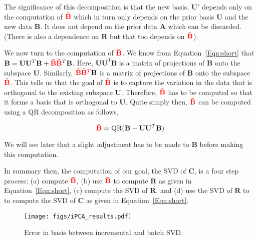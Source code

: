 The significance of this decomposition is that the new basis, $\mathbf{U'}$ depends only on the computation of ${\color{red}\mathbf{\tilde{B}}}$ which in turn only depends on the prior basis $\mathbf{U}$ and the new data  $\mathbf{B}$.  It does not depend on the prior data $\mathbf{A}$ which can be discarded.  (There is also a dependence on $\mathbf{R}$ but that too depends on ${\color{red}\mathbf{\tilde{B}}}$).

We now turn to the computation of $ {\color{red}\mathbf{\tilde{B}}}$.  We know from Equation~\ref{Eqn:short} that $\mathbf{B}=\mathbf{U}\mathbf{U}^T\mathbf{B} + {\color{red}\mathbf{\tilde{B}}} {{\color{red}\mathbf{\tilde{B}}}^T}\mathbf{B}$.  Here, $\mathbf{U}\mathbf{U}^T\mathbf{B}$ is a matrix of projections of $\mathbf{B}$ onto the subspace $\mathbf{U}$.  Similarly, ${\color{red}\mathbf{\tilde{B}}} {\color{red}\mathbf{\tilde{B}}^T}\mathbf{B}$ is a matrix of projections of $\mathbf{B}$ onto the subspace ${\color{red}\mathbf{\tilde{B}}}$.  This tells us that the goal of ${\color{red}\mathbf{\tilde{B}}}$ is to capture the variation in the data that is orthogonal to the existing subspace $\mathbf{U}$.  Therefore, ${\color{red}\mathbf{\tilde{B}}}$ has to be computed so that it forms a basis that is orthogonal to $\mathbf{U}$.  Quite simply then, ${\color{red}\mathbf{\tilde{B}}}$ can be computed using a QR decomposition as follows,


\begin{equation}
{\color{red}\mathbf{\tilde{B}}}=\textrm{QR}(\mathbf{B} - \mathbf{U}\mathbf{U}^T\mathbf{B})
\end{equation}

We will see later that a slight adjustment has to be made to $\mathbf{B}$ before making this computation.

In summary then, the computation of our goal, the SVD of $\mathbf{C}$, is a four step process: (a) compute ${\color{red}\mathbf{\tilde{B}}}$, (b) use ${\color{red}\mathbf{\tilde{B}}}$ to compute $\mathbf{R}$ as given in Equation~\ref{Eqn:short}, (c) compute the SVD of $\mathbf{R}$, and (d) use the SVD of $\mathbf{R}$ to to compute the SVD of $\mathbf{C}$ as given in Equation~\ref{Eqn:short}.  

								\begin{figure}[t]
								\centering
								\texttt{[image: figs/iPCA\_results.pdf]}
								\caption{Error in basis between incremental and batch SVD.}
								\label{iPCA_results}
								\end{figure}

